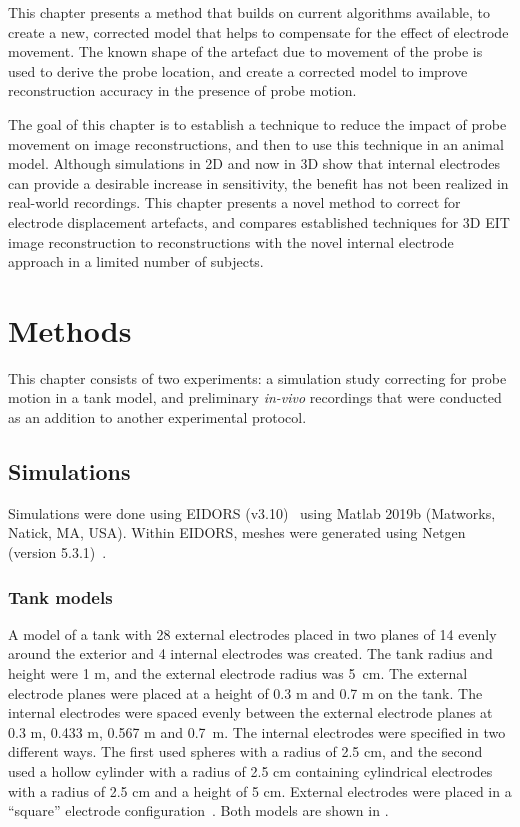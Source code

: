 This chapter presents a method that builds on current algorithms 
available, to create a new, corrected model
that helps to compensate for the effect of electrode movement.  
The known shape of the artefact due to movement of the probe is used to 
derive the probe location, and create a corrected model to improve 
reconstruction accuracy in the presence of probe motion.

The goal of this chapter is to establish a technique to reduce the impact of probe movement on 
image reconstructions, and then to use this technique in an animal model. 
Although simulations in 2D and now in 3D show that internal electrodes can provide 
a desirable increase in sensitivity, the benefit has not been realized in real-world
recordings. 
This chapter presents a novel method to correct for electrode displacement artefacts, 
and compares established techniques for 3D EIT image reconstruction 
to reconstructions with the novel internal electrode approach in a limited number of 
subjects.

\section{Methods}
This chapter consists of two experiments: a simulation study correcting for probe motion 
in a tank model, and preliminary \emph{in-vivo} recordings that were conducted as an 
addition to another experimental protocol. 

\subsection{Simulations}
Simulations were done using EIDORS (v3.10)~\parencite{adler_eidors_2017}
using Matlab 2019b (Matworks, Natick, MA, USA).
Within EIDORS, meshes were generated using 
Netgen (version 5.3.1)~\parencite{schoberl_netgen_1997}.

\subsubsection{Tank models}
A model of a tank with 28 external electrodes placed in two planes of 14
evenly around the exterior
and 4 internal electrodes was created. 
The tank radius and height were 1 m, and the external electrode radius was 5 cm. 
The external electrode planes were placed at a height of 0.3 m and 0.7 m on the tank. 
The internal electrodes were spaced evenly between the external electrode planes 
at 0.3 m, 0.433 m, 0.567 m and 0.7 m. The internal electrodes were specified in 
two different ways. The first used spheres with a radius of 2.5 cm, and the second 
used a hollow cylinder with a radius of 2.5 cm containing cylindrical electrodes
with a radius of 2.5 cm and a height of 5 cm. External electrodes were
placed in a ``square'' electrode configuration~\parencite{grychtol_3d_2016}. 
Both models are shown in .

